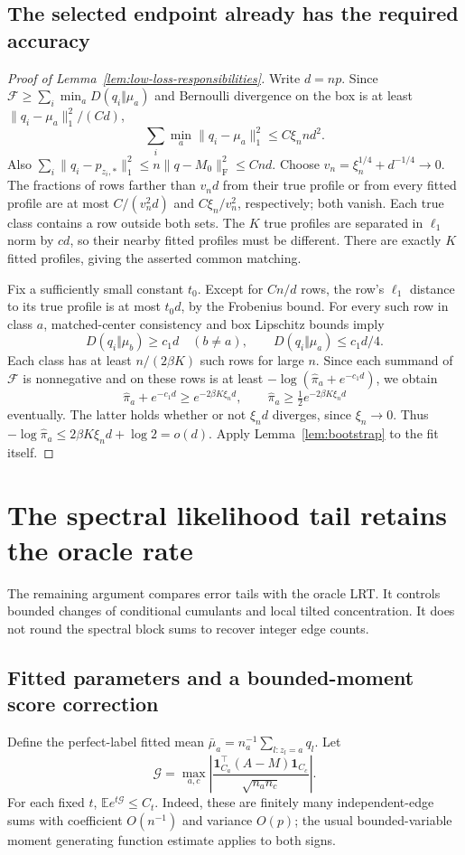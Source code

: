 \documentclass[11pt]{article}
\theoremstyle{definition}
\theoremstyle{remark}
\newcommand{\E}{\mathbb E}
\newcommand{\one}{\mathbf 1}
\numberwithin{equation}{section}
\begin{document}
\subsection{The selected endpoint already has the required accuracy}
\begin{proof}[Proof of Lemma~\ref{lem:low-loss-responsibilities}]
Write $d=np$. Since $\mathcal F\ge\sum_i\min_aD(q_i\Vert\mu_a)$ and Bernoulli divergence on the box is at least $\|q_i-\mu_a\|_1^2/(Cd)$,
\[
 \sum_i\min_a\|q_i-\mu_a\|_1^2\le C\xi_n n d^2.
\]
Also $\sum_i\|q_i-p_{z_i,*}\|_1^2\le n\|q-M_0\|_{\mathrm F}^2\le Cnd$. Choose $v_n=\xi_n^{1/4}+d^{-1/4}\to0$. The fractions of rows farther than $v_nd$ from their true profile or from every fitted profile are at most $C/(v_n^2d)$ and $C\xi_n/v_n^2$, respectively; both vanish. Each true class contains a row outside both sets. The $K$ true profiles are separated in $\ell_1$ norm by $c d$, so their nearby fitted profiles must be different. There are exactly $K$ fitted profiles, giving the asserted common matching.

Fix a sufficiently small constant $t_0$. Except for $Cn/d$ rows, the row's $\ell_1$ distance to its true profile is at most $t_0d$, by the Frobenius bound. For every such row in class $a$, matched-center consistency and box Lipschitz bounds imply
\[
 D(q_i\Vert\mu_b)\ge c_1d\quad(b\ne a),\qquad
 D(q_i\Vert\mu_a)\le c_1d/4.
\]
Each class has at least $n/(2\beta K)$ such rows for large $n$. Since each summand of $\mathcal F$ is nonnegative and on these rows is at least $-\log(\widehat\pi_a+e^{-c_1d})$, we obtain
\[
 \widehat\pi_a+e^{-c_1d}\ge e^{-2\beta K\xi_nd},\qquad
 \widehat\pi_a\ge\tfrac12 e^{-2\beta K\xi_nd}
\]
eventually. The latter holds whether or not $\xi_nd$ diverges, since $\xi_n\to0$. Thus $-\log\widehat\pi_a\le2\beta K\xi_nd+\log2=o(d)$. Apply Lemma~\ref{lem:bootstrap} to the fit itself.
\end{proof}


\section{The spectral likelihood tail retains the oracle rate}
The remaining argument compares error tails with the oracle LRT. It controls bounded changes of conditional cumulants and local tilted concentration. It does not round the spectral block sums to recover integer edge counts.
\subsection{Fitted parameters and a bounded-moment score correction}\label{app:general-local-em}
Define the perfect-label fitted mean $\bar\mu_a=n_a^{-1}\sum_{l:z_l=a}q_l$. Let
\[
 \mathcal G=\max_{a,c}\left|\frac{\one_{C_a}^\top(A-M)\one_{C_c}}{\sqrt{n_an_c}}\right|.
\]
For each fixed $t$, $\E e^{t\mathcal G}\le C_t$. Indeed, these are finitely many independent-edge sums with coefficient $O(n^{-1})$ and variance $O(p)$; the usual bounded-variable moment generating function estimate applies to both signs.
\end{document}
